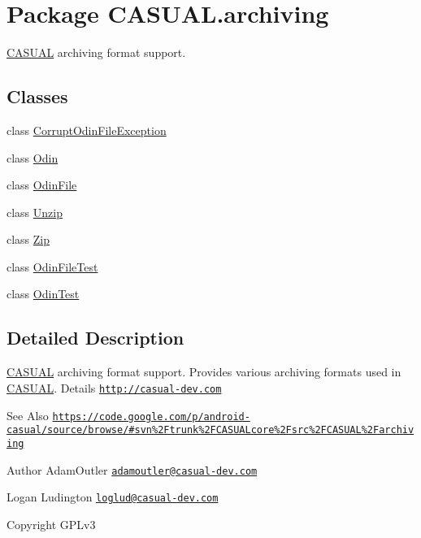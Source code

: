 \hypertarget{namespaceCASUAL_1_1archiving}{\section{Package C\-A\-S\-U\-A\-L.\-archiving}
\label{namespaceCASUAL_1_1archiving}
}


\hyperlink{namespaceCASUAL}{C\-A\-S\-U\-A\-L} archiving format support.  


\subsection*{Classes}
\begin{DoxyCompactItemize}
\item 
class \hyperlink{classCASUAL_1_1archiving_1_1CorruptOdinFileException}{Corrupt\-Odin\-File\-Exception}
\item 
class \hyperlink{classCASUAL_1_1archiving_1_1Odin}{Odin}
\item 
class \hyperlink{classCASUAL_1_1archiving_1_1OdinFile}{Odin\-File}
\item 
class \hyperlink{classCASUAL_1_1archiving_1_1Unzip}{Unzip}
\item 
class \hyperlink{classCASUAL_1_1archiving_1_1Zip}{Zip}
\item 
class \hyperlink{classCASUAL_1_1archiving_1_1OdinFileTest}{Odin\-File\-Test}
\item 
class \hyperlink{classCASUAL_1_1archiving_1_1OdinTest}{Odin\-Test}
\end{DoxyCompactItemize}


\subsection{Detailed Description}
\hyperlink{namespaceCASUAL}{C\-A\-S\-U\-A\-L} archiving format support. Provides various archiving formats used in \hyperlink{namespaceCASUAL}{C\-A\-S\-U\-A\-L}. Details \href{http://casual-dev.com}{\tt http\-://casual-\/dev.\-com} \begin{DoxySeeAlso}{See Also}
\href{https://code.google.com/p/android-casual/source/browse/#svn%2Ftrunk%2FCASUALcore%2Fsrc%2FCASUAL%2Farchiving}{\tt https\-://code.\-google.\-com/p/android-\/casual/source/browse/\#svn\%2\-Ftrunk\%2\-F\-C\-A\-S\-U\-A\-Lcore\%2\-Fsrc\%2\-F\-C\-A\-S\-U\-A\-L\%2\-Farchiving} 
\end{DoxySeeAlso}
\begin{DoxyAuthor}{Author}
Adam\-Outler \href{mailto:adamoutler@casual-dev.com}{\tt adamoutler@casual-\/dev.\-com} 

Logan Ludington \href{mailto:loglud@casual-dev.com}{\tt loglud@casual-\/dev.\-com} 
\end{DoxyAuthor}
\begin{DoxyCopyright}{Copyright}
G\-P\-Lv3 
\end{DoxyCopyright}

